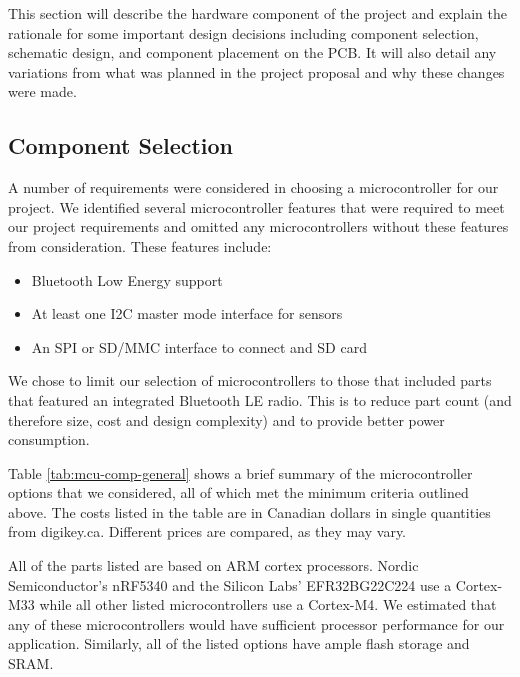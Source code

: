 This section will describe the hardware component of the project and explain 
the rationale for some important design decisions including component selection,
schematic design, and component placement on the PCB. It will also detail any 
variations from what was planned in the project proposal and why these changes
were made.

\subsection{Component Selection}

A number of requirements were considered in choosing a microcontroller for our
project. We identified several microcontroller features that were required to
meet our project requirements and omitted any microcontrollers
without these features from consideration. These features include:
\begin{itemize}
    \item Bluetooth Low Energy support
    \item At least one I2C master mode interface for sensors
    \item An SPI or SD/MMC interface to connect and SD card
\end{itemize}

We chose to limit our selection of microcontrollers to those that included parts 
that featured an integrated Bluetooth LE radio. This is
to reduce part count (and therefore size, cost and design complexity) and to
provide better power consumption.

Table \ref{tab:mcu-comp-general} shows a brief summary of the microcontroller
options that we considered, all of which met the minimum criteria outlined
above. The costs listed in the table are in Canadian dollars in single
quantities from digikey.ca. Different prices are compared, as they may vary.

All of the parts listed are based on ARM cortex processors. Nordic
Semiconductor's nRF5340 and the Silicon Labs’ EFR32BG22C224 use a Cortex-M33
while all other listed microcontrollers use a Cortex-M4. We estimated that
any of these microcontrollers would have sufficient processor performance for
our application. Similarly, all of the listed options have ample flash storage
and SRAM.

